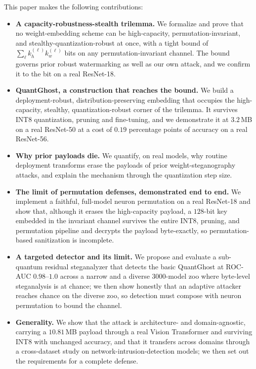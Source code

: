 \documentclass[10pt,journal]{IEEEtran}
\theoremstyle{remark}
\newcommand{\sys}{\mbox{QuantGhost}}
\begin{document}
This paper makes the following contributions:
\begin{itemize}
\item \textbf{A capacity-robustness-stealth trilemma.} We formalize and prove that no
  weight-embedding scheme can be high-capacity, permutation-invariant, and
  stealthy-quantization-robust at once, with a tight bound of
  $\sum_\ell k_h^{(\ell)} k_w^{(\ell)}$ bits on any permutation-invariant channel. The
  bound governs prior robust watermarking as well as our own attack, and we confirm it
  to the bit on a real ResNet-18.
\item \textbf{\sys, a construction that reaches the bound.} We build a
  deployment-robust, distribution-preserving embedding that occupies the
  high-capacity, stealthy, quantization-robust corner of the trilemma. It survives INT8
  quantization, pruning and fine-tuning, and we demonstrate it at $3.2$\,MB on a real
  ResNet-50 at a cost of $0.19$ percentage points of accuracy on a real ResNet-56.
\item \textbf{Why prior payloads die.} We quantify, on real models, why routine
  deployment transforms erase the payloads of prior weight-steganography attacks, and
  explain the mechanism through the quantization step size.
\item \textbf{The limit of permutation defenses, demonstrated end to end.} We implement
  a faithful, full-model neuron permutation on a real ResNet-18 and show that, although it
  erases the high-capacity payload, a $128$-bit key embedded in the invariant channel
  survives the entire INT8, pruning, and permutation pipeline and decrypts the payload
  byte-exactly, so permutation-based sanitization is incomplete.
\item \textbf{A targeted detector and its limit.} We propose and evaluate a sub-quantum
  residual steganalyzer that detects the basic \sys{} at ROC-AUC $0.98$--$1.0$ across a
  narrow and a diverse $3000$-model zoo where byte-level steganalysis is at chance; we then
  show honestly that an adaptive attacker reaches chance on the diverse zoo, so detection
  must compose with neuron permutation to bound the channel.
\item \textbf{Generality.} We show that the attack is architecture- and domain-agnostic,
  carrying a $10.81$\,MB payload through a real Vision Transformer and surviving INT8 with
  unchanged accuracy, and that it transfers across domains through a cross-dataset study on
  network-intrusion-detection models; we then set out the requirements for a complete defense.
\end{itemize}
\end{document}
